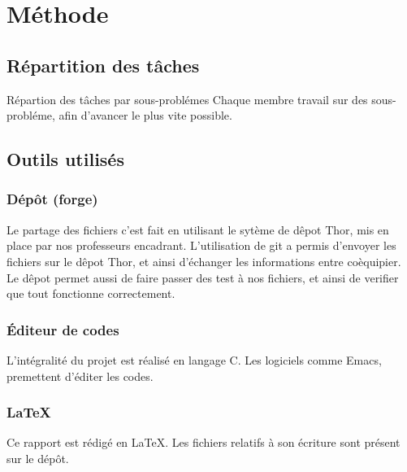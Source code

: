 \documentclass{article}
\begin{document}
\section{M\'ethode}

\subsection{R\'epartition des t\^aches}
R\'epartion des t\^aches par sous-probl\'emes 
Chaque membre travail sur des sous-probl\'eme, afin d'avancer le plus vite possible.    

\subsection{Outils utilis\'es}

\subsubsection{D\'ep\^ot (forge)}

Le partage des fichiers c'est fait en utilisant le syt\`eme de d\^epot Thor, mis en place par nos professeurs encadrant. 
L'utilisation de git a permis d'envoyer les fichiers sur le d\^epot Thor, et ainsi d'\'echanger les informations entre co\`equipier.
Le d\^epot permet aussi de faire passer des test \`a nos fichiers, et ainsi de verifier que tout fonctionne correctement. 

\subsubsection{\'Editeur de codes}
L'int\'egralit\'e du projet est r\'ealis\'e en langage C.
Les logiciels comme Emacs, premettent d'\'editer les codes. 

\subsubsection{\LaTeX}

Ce rapport est r\'edig\'e en \LaTeX. Les fichiers relatifs \`a son \'ecriture sont pr\'esent sur le d\'ep\^ot. 
\end{document}
